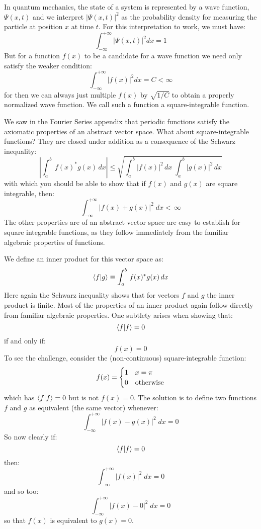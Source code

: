 \documentclass[12pt]{book}
\begin{document}
In quantum mechanics, the state of a system is represented by a wave function, $\Psi(x,t)$ and we interpret $|\Psi(x,t)|^2$ as the probability density for measuring the particle at position $x$ at time $t$.  For this interpretation to work, we must have:
$$\int_{-\infty}^{+\infty} |\Psi(x,t)|^2 dx = 1$$
But for a function $f(x)$ to be a candidate for a wave function we need only satisfy the weaker condition:
$$\int_{-\infty}^{+\infty} |f(x)|^2 dx = C < \infty$$
for then we can always just multiple $f(x)$ by $\sqrt{1/C}$ to obtain a properly normalized wave function.  We call such a function a square-integrable function.

We saw in the Fourier Series appendix that periodic functions satisfy the axiomatic properties of an abstract vector space.  What about square-integrable functions?  They are closed under addition as a consequence of the Schwarz inequality:
\begin{equation}
\left|\int_a^b \, f(x)^* g(x) \, dx\right| \leq \sqrt{\int_a^b |f(x)|^2 \, dx \; \int_a^b |g(x)|^2 \, dx}
\end{equation}
with which you should be able to show that if $f(x)$ and $g(x)$ are square integrable, then:
$$\int_{-\infty}^{+\infty} |f(x) + g(x)|^2 \; dx < \, \infty$$
The other properties are of an abstract vector space are easy to establish for square integrable functions, as they follow immediately from the familiar algebraic properties of functions. 

We define an inner product for this vector space as:
$$\braket{f|g} \equiv \int_a^b \, f(x)^* g(x) \, dx$$
Here again the Schwarz inequality shows that for vectors $f$ and $g$ the inner product is finite.  Most of the properties of an inner product again follow directly from familiar algebraic properties.  One subtlety arises when showing that:
$$\braket{f|f}=0$$
if and only if:
$$f(x)=0$$
To see the challenge, consider the (non-continuous) square-integrable function:
$$f(x)=
\begin{cases}
1 & x=\pi \\
0 & {\rm otherwise} \\
\end{cases}
$$
which has $\braket{f|f}=0$ but is not $f(x)=0$.  The solution is to define two functions $f$ and $g$ as equivalent (the same vector) whenever:
$$\int_{-\infty}^{+\infty} |f(x) - g(x)|^2 \; dx = 0 $$
So now clearly if:
$$\braket{f|f} = 0$$
then:
$$\int_{-\infty}^{+\infty} |f(x)|^2 \; dx = 0 $$
and so too:
$$\int_{-\infty}^{+\infty} |f(x) - 0|^2 \; dx = 0 $$
so that $f(x)$ is equivalent to $g(x)=0$.
\end{document}
